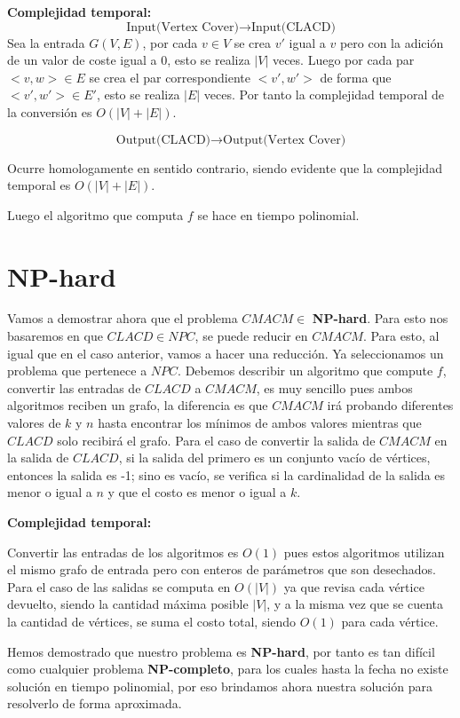 \documentclass{article}
\begin{document}
\begin{enumerate}
    \textbf{Complejidad temporal:}
    \[
    \text{Input(Vertex Cover)} \rightarrow \text{Input(CLACD)}
    \]
    Sea la entrada $G(V,E)$, por cada $v \in V$ se crea $v'$ igual a $v$ pero con la adición de un valor de coste igual a 0, esto se realiza $|V|$ veces. Luego por cada par $<v,w> \in E$ se crea el par correspondiente $<v',w'>$ de forma que $<v',w'> \in E'$, esto se realiza $|E|$ veces. Por tanto la complejidad temporal de la conversión es $O(|V|+|E|)$.

    \[
    \text{Output(CLACD)} \rightarrow \text{Output(Vertex Cover)}
    \]

    Ocurre homologamente en sentido contrario, siendo evidente que la complejidad temporal es $O(|V|+|E|)$.

    Luego el algoritmo que computa $f$ se hace en tiempo polinomial.
\end{enumerate}

\section{NP-hard}

Vamos a demostrar ahora que el problema $CMACM \in$ \textbf{NP-hard}. Para esto nos basaremos en que $CLACD \in NPC$, se puede reducir en $CMACM$. Para esto, al igual que en el caso anterior, vamos a hacer una reducción. Ya seleccionamos un problema que pertenece a $NPC$. Debemos describir un algoritmo que compute $f$, convertir las entradas de $CLACD$ a $CMACM$, es muy sencillo pues ambos algoritmos reciben un grafo, la diferencia es que $CMACM$ irá probando diferentes valores de $k$ y $n$ hasta encontrar los mínimos de ambos valores mientras que $CLACD$ solo recibirá el grafo. Para el caso de convertir la salida de $CMACM$ en la salida de $CLACD$, si la salida del primero es un conjunto vacío de vértices, entonces la salida es -1; sino es vacío, se verifica si la cardinalidad de la salida es menor o igual a $n$ y que el costo es menor o igual a $k$.

\textbf{Complejidad temporal:}

Convertir las entradas de los algoritmos es $O(1)$ pues estos algoritmos utilizan el mismo grafo de entrada pero con enteros de parámetros que son desechados. Para el caso de las salidas se computa en $O(|V|)$ ya que revisa cada vértice devuelto, siendo la cantidad máxima posible $|V|$, y a la misma vez que se cuenta la cantidad de vértices, se suma el costo total, siendo $O(1)$ para cada vértice.

Hemos demostrado que nuestro problema es \textbf{NP-hard}, por tanto es tan difícil como cualquier problema \textbf{NP-completo}, para los cuales hasta la fecha no existe solución en tiempo polinomial, por eso brindamos ahora nuestra solución para resolverlo de forma aproximada.
\end{document}
